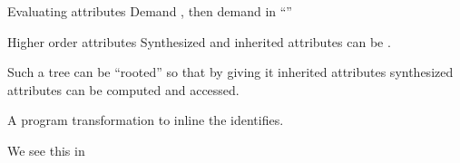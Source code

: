 \documentclass[11pt,aspectratio=169]{beamer}
\newcommand{\ys}{1.3}
\newcommand{\enve}[2]{\draw[blue] ($(#1-0.4,\ys*#2-0.35)$) circle(0.15);}
\newcommand{\envd}[2]{\filldraw[blue] ($(#1-0.4,\ys*#2-0.35)$) circle(0.05);}
\newcommand{\envc}[2]{\filldraw[blue] ($(#1-0.4,\ys*#2-0.35)$) circle(0.15);}
\newcommand{\ppe}[2]{\draw[dgreen] ($(#1+0.4,\ys*#2-0.35)$) circle(0.15);}
\newcommand{\ppd}[2]{\filldraw[dgreen] ($(#1+0.4,\ys*#2-0.35)$) circle(0.05);}
\newcommand{\ppc}[2]{\filldraw[dgreen] ($(#1+0.4,\ys*#2-0.35)$) circle(0.15);}
\newcommand{\vale}[2]{\draw[red] ($(#1+0.8,\ys*#2-0.35)$) circle(0.15);}
\newcommand{\vald}[2]{\filldraw[red] ($(#1+0.8,\ys*#2-0.35)$) circle(0.05);}
\newcommand{\valc}[2]{\filldraw[red] ($(#1+0.8,\ys*#2-0.35)$) circle(0.15);}
\newcommand{\erre}[2]{\draw[orange] ($(#1+1.2,\ys*#2-0.35)$) circle(0.15);}
\newcommand{\rtn}[3]{
\draw ($(#1,#2*\ys)$) node{#3};
\ppe{#1}{#2}
\vale{#1}{#2}

\draw[gray] ($(#1+0.65,\ys*#2+0.25)$) --
            ($(#1-0.3,\ys*#2+0.25)$) arc (90:270:4.5mm);

\draw[gray] ($(#1+0.65,\ys*#2+0.25)$) arc (90:-90:4.5mm) -- 
            ($(#1-0.3,\ys*#2-0.65)$) ;
}
\newcommand{\tn}[3]{
\rtn{#1}{#2}{#3}
\enve{#1}{#2}
}
\newcommand{\tnstr}[3]{
\draw ($(#1,#2*\ys)$) node{#3};
\draw[gray] ($(#1+0.25,\ys*#2+0.25)$) --
            ($(#1-0.2,\ys*#2+0.25)$) arc (90:270:2.5mm);

\draw[gray] ($(#1+0.25,\ys*#2+0.25)$) arc (90:-90:2.5mm) -- 
            ($(#1-0.2,\ys*#2-0.25)$) ;

}
\newcommand{\tedge}[4]{
\draw[gray] ($(#1+\xsh,\ys*#2-0.65)$) -- ($(#3+\xsh,\ys*#4+0.25)$);
}
\newcommand{\ppeval}{
\pause
\ppd{4}{4} %
\pause
\ppd{4}{3} %

\pause
\ppd{4}{2} %
\pause
\ppc{4}{2} %
\pause
\ppd{6.5}{2}  %

\pause
\ppd{5.25}{1} %
\pause
\ppc{5.25}{1} %
\pause
\ppd{7.75}{1} %
\pause
\ppc{7.75}{1} %

\pause
\ppc{6.5}{2}  %

\pause
\ppc{4}{3} %

\pause
\ppc{4}{4} %
}
\newcommand{\valeval}{
\pause\vald{4}{4} %
\pause\vald{4}{3} %

\pause\vald{6.5}{2}  %
\pause\vald{5.25}{1} %
\pause\valc{5.25}{1} %

\pause\vald{7.75}{1} %

\pause\envd{7.75}{1} %

\pause\envd{6.5}{2}  %

\pause
\draw ($(5.5,\ys*-0.5)$) node {\small\texttt{body.env = (name, dexp.val) :: e.env;}};

\pause\vald{4}{2} %
\pause\valc{4}{2} %

\pause\envd{4}{3} %
\pause\envc{4}{3} %

\pause\envc{6.5}{2}  %

\pause

\pause\envc{7.75}{1} %

\pause\valc{7.75}{1} %
\pause\valc{6.5}{2}  %

\pause\valc{4}{3} %

\pause\valc{4}{4} %
}
\newcommand{\xsh}{0.15}
\begin{document}
\begin{frame}[t,fragile]{Evaluating attributes}
Demand , then demand  in ``''

\bigskip

\begin{minipage}[t]{2.9in}
\vspace{0pt}
\end{minipage}
\begin{minipage}[t]{2.1in}
\vspace{0pt}

\end{minipage}
\end{frame}


\begin{frame}{Higher order attributes}
\biA
 \x Synthesized and inherited attributes can be .

 \x Such a tree can be ``rooted'' so that
  \bi
   \x by giving it inherited attributes
   \x synthesized attributes can be computed and accessed.
  \ei

 \x {}

    \medskip
    A program transformation to inline the identifies.

 \x We see this in 
\ei
\end{frame}
\end{document}
